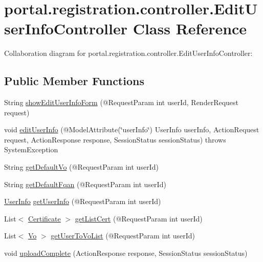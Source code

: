 \hypertarget{classportal_1_1registration_1_1controller_1_1EditUserInfoController}{
\section{portal.registration.controller.EditUserInfoController Class Reference}
\label{classportal_1_1registration_1_1controller_1_1EditUserInfoController}
}


Collaboration diagram for portal.registration.controller.EditUserInfoController:
\subsection*{Public Member Functions}
\begin{DoxyCompactItemize}
\item 
String \hyperlink{classportal_1_1registration_1_1controller_1_1EditUserInfoController_a09ee8e90312405588fd950063bb797e4}{showEditUserInfoForm} (@RequestParam int userId, RenderRequest request)
\item 
void \hyperlink{classportal_1_1registration_1_1controller_1_1EditUserInfoController_af4b8f77882febac15cb98813ad8b89da}{editUserInfo} (@ModelAttribute(\char`\"{}userInfo\char`\"{}) UserInfo userInfo, ActionRequest request, ActionResponse response, SessionStatus sessionStatus)  throws SystemException 
\item 
String \hyperlink{classportal_1_1registration_1_1controller_1_1EditUserInfoController_a4c6f1ba65b8e273d4d797460dc4ccfe0}{getDefaultVo} (@RequestParam int userId)
\item 
String \hyperlink{classportal_1_1registration_1_1controller_1_1EditUserInfoController_a1b09df477dad855f216695324332048e}{getDefaultFqan} (@RequestParam int userId)
\item 
\hyperlink{classportal_1_1registration_1_1domain_1_1UserInfo}{UserInfo} \hyperlink{classportal_1_1registration_1_1controller_1_1EditUserInfoController_a3d4be346ddb5fe32799a2c2298f032de}{getUserInfo} (@RequestParam int userId)
\item 
List$<$ \hyperlink{classportal_1_1registration_1_1domain_1_1Certificate}{Certificate} $>$ \hyperlink{classportal_1_1registration_1_1controller_1_1EditUserInfoController_ac6fa84cda72409ea5928359f60c6cf7c}{getListCert} (@RequestParam int userId)
\item 
List$<$ \hyperlink{classportal_1_1registration_1_1domain_1_1Vo}{Vo} $>$ \hyperlink{classportal_1_1registration_1_1controller_1_1EditUserInfoController_a1b6482d97146c7f03383907df1ff7513}{getUserToVoList} (@RequestParam int userId)
\item 
void \hyperlink{classportal_1_1registration_1_1controller_1_1EditUserInfoController_a3b8074d37864402deee109774e44ea3d}{uploadComplete} (ActionResponse response, SessionStatus sessionStatus)
\end{DoxyCompactItemize}
